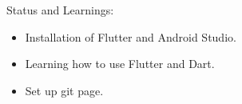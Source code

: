 \documentclass[14pt]{beamer}
\begin{document}
\begin{frame}{Status and Learnings: }
	\begin{itemize}
		\item Installation of \alert{Flutter} and \alert{Android Studio}.
			
		\item Learning how to use \alert{Flutter} and \alert{Dart}.
			
		\item Set up \alert{git page}.
	\end{itemize}
\end{frame}
\end{document}
